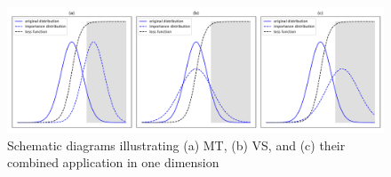     \begin{figure}[H]
        \centering
        \includegraphics[scale=0.40]{Figures/Images/Methods/IS_techniques.png}
        \caption{Schematic diagrams illustrating (a) MT, (b) VS, and (c) their combined application in one dimension \protect\cite{lu_improved_1988}}
        \label{fig:IS_techniques}
    \end{figure}